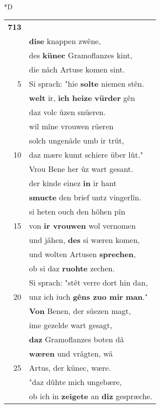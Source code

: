 \documentclass[8pt,a4paper,notitlepage]{article}
\begin{document}
\begin{table}[ht]
\begin{minipage}[t]{0.5\linewidth}
\small
\begin{center}*D
\end{center}
\begin{tabular}{rl}
\textbf{713} & \textit{\begin{large}D\end{large}}ô erkante \textbf{wol} vrou Bene\\ 
 & \textbf{dise} knappen zwêne,\\ 
 & des \textbf{künec} Gramoflanzes kint,\\ 
 & die nâch Artuse komen sint.\\ 
5 & Si sprach: "hie \textbf{solte} niemen stên.\\ 
 & \textbf{welt} ir, \textbf{ich heize} \textbf{vürder} gên\\ 
 & daz volc ûzen snüeren.\\ 
 & wil mîne vrouwen rüeren\\ 
 & solch ungenâde umb ir trût,\\ 
10 & daz mære kumt schiere über lût."\\ 
 & Vrou Bene her ûz wart gesant.\\ 
 & der kinde einez \textbf{in} ir hant\\ 
 & \textbf{smucte} den brief untz vingerlîn.\\ 
 & si heten ouch den hôhen pîn\\ 
15 & von \textbf{ir vrouwen} wol vernomen\\ 
 & und jâhen, \textbf{des} si wæren komen,\\ 
 & und wolten Artusen \textbf{sprechen},\\ 
 & ob si daz \textbf{ruohte} zechen.\\ 
 & Si sprach: "stêt verre dort hin dan,\\ 
20 & unz ich iuch \textbf{gêns zuo mir} \textbf{man}."\\ 
 & \textbf{Von} Benen, der süezen magt,\\ 
 & ime gezelde wart gesagt,\\ 
 & \textbf{daz} Gramoflanzes boten dâ\\ 
 & \textbf{wæren} und vrâgten, wâ\\ 
25 & Artus, der künec, wære.\\ 
 & "daz dûhte mich ungebære,\\ 
 & ob ich in \textbf{zeigete} an \textbf{diz} gespræche.\\ 

\end{tabular}
\end{minipage}
\end{table}
\end{document}
